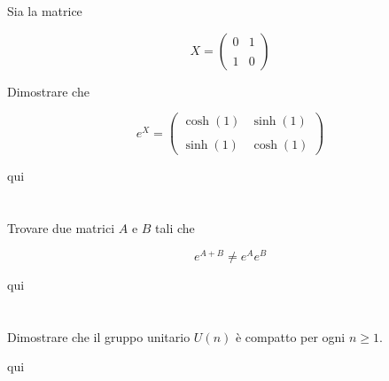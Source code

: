 \begin{tcolorbox}
	Sia la matrice
	
	\begin{equation}
		X = \begin{pmatrix} 0 & 1 \\\\ 1 & 0 \end{pmatrix}
	\end{equation}

	Dimostrare che
	
	\begin{equation}
		e^{X} = \begin{pmatrix} \cosh(1) & \sinh(1) \\\\ \sinh(1) & \cosh(1) \end{pmatrix}
	\end{equation}
\end{tcolorbox}

qui

\section{}\label{es3-4}

\begin{tcolorbox}
	Trovare due matrici $ A $ e $ B $ tali che
	
	\begin{equation}
		e^{A+B} \neq e^{A} e^{B}
	\end{equation}
\end{tcolorbox}

qui

\section{}\label{es3-5}

\begin{tcolorbox}
	Dimostrare che il gruppo unitario $ U(n) $ è compatto per ogni $ n \geqslant 1 $.
\end{tcolorbox}

qui

\section{}\label{es3-6}

